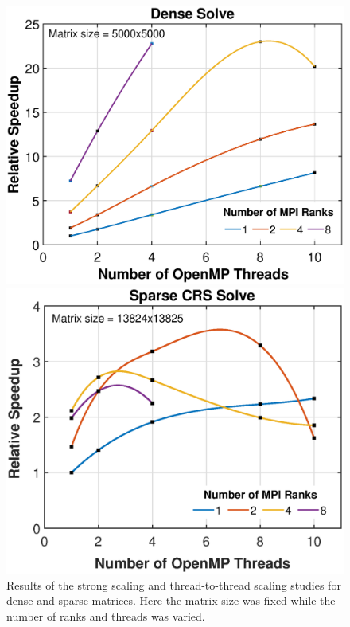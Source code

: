 \documentclass{article}
\begin{document}
\begin{figure}[H]
	\begin{minipage}[b]{0.5\linewidth}
		\centering
		\includegraphics[width=1.0\textwidth]{dense_strong_scaling_report.eps}  
	\end{minipage}
	\begin{minipage}[b]{0.5\linewidth}
		\centering
		\includegraphics[width=1.0\textwidth]{sparse_strong_scaling_report.eps}  
	\end{minipage}
	\caption{Results of the strong scaling and thread-to-thread scaling studies for dense and sparse matrices. Here the matrix size was fixed while the number of ranks and threads was varied.}
	\label{fig:strong_scaling}
\end{figure}
\end{document}
